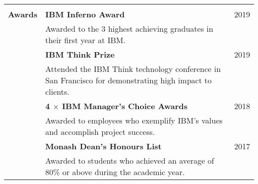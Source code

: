 \documentclass[a4paper,10pt]{letter}
\begin{document}
\begin{longtable}{ @{} p{2.5cm} p{12cm} r }
\hline \\
\large
\textbf{Awards} & \textbf{IBM Inferno Award} & \normalsize 2019 \\
& Awarded to the 3 highest achieving graduates in their first year at IBM. & \\
 & \textbf{IBM Think Prize} & \normalsize 2019 \\
& Attended the IBM Think technology conference in San Francisco for demonstrating high impact to clients. & \\
 & \textbf{4 $\times$ IBM Manager's Choice Awards} & \normalsize 2018 \\
& Awarded to employees who exemplify IBM's values and accomplish project success. & \\
 & \textbf{Monash Dean's Honours List} & \normalsize 2017 \\
& Awarded to students who achieved an average of 80\% or above during the academic year. & \\
\end{longtable}
\end{document}
